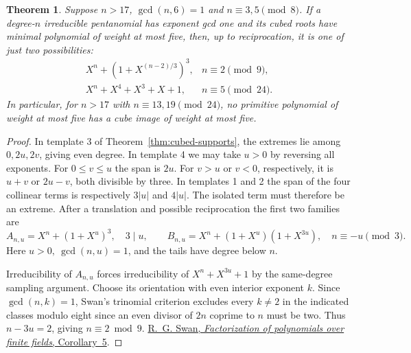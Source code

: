 \documentclass[11pt]{article}
\newtheorem{theorem}{Theorem}
\begin{document}
\begin{theorem}\label{thm:cubed-parity}
Suppose \(n>17\), \(\gcd(n,6)=1\) and \(n\equiv3,5\pmod8\). If a
degree-\(n\) irreducible pentanomial has exponent gcd one and its cubed
roots have minimal polynomial of weight at most five, then, up to
reciprocation, it is one of just two possibilities:
\[
\begin{array}{ll}
 X^n+(1+X^{(n-2)/3})^3, & n\equiv2\pmod9,\\
 X^n+X^4+X^3+X+1, & n\equiv5\pmod{24}.
\end{array}
\]
In particular, for \(n>17\) with \(n\equiv13,19\pmod{24}\), no
primitive polynomial of weight at most five has a cube image of
weight at most five.
\end{theorem}
\begin{proof}
In template 3 of Theorem~\ref{thm:cubed-supports}, the extremes lie
among \(0,2u,2v\), giving even degree. In template 4 we may take
\(u>0\) by reversing all exponents. For \(0\le v\le u\) the span is
\(2u\). For \(v>u\) or \(v<0\), respectively, it is \(u+v\) or
\(2u-v\), both divisible by three. In templates 1 and 2 the span of
the four collinear terms is respectively \(3|u|\) and \(4|u|\).
The isolated term must therefore be an extreme. After a translation
and possible reciprocation the first two families are
\[
 A_{n,u}=X^n+(1+X^u)^3,\quad 3\mid u,\qquad
 B_{n,u}=X^n+(1+X^u)(1+X^{3u}),\quad n\equiv-u\pmod3.
\]
Here \(u>0,\ \gcd(n,u)=1\), and the tails have degree below \(n\).

Irreducibility of \(A_{n,u}\) forces irreducibility of
\(X^n+X^{3u}+1\) by the same-degree sampling argument.
Choose its orientation with even interior exponent \(k\). Since
\(\gcd(n,k)=1\), Swan's trinomial criterion excludes every \(k\ne2\)
in the indicated classes modulo eight since an even divisor of \(2n\)
coprime to \(n\) must be two. Thus \(n-3u=2\), giving \(n\equiv2\bmod9\).
\href{https://msp.org/pjm/1962/12-3/pjm-v12-n3-p27-p.pdf}{R.~G. Swan,
\emph{Factorization of polynomials over finite fields}, Corollary~5}.


\end{proof}
\end{document}

